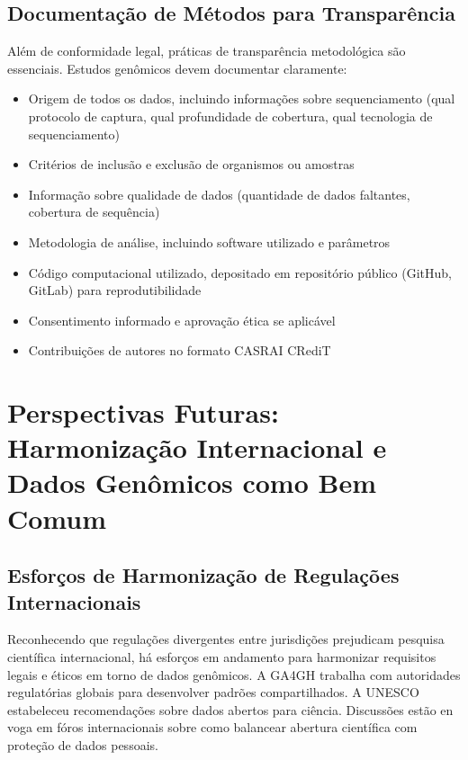 \subsection{Documentação de Métodos para Transparência}

Além de conformidade legal, práticas de transparência metodológica são essenciais. Estudos genômicos devem documentar claramente:

\begin{itemize}
    \item Origem de todos os dados, incluindo informações sobre sequenciamento (qual protocolo de captura, qual profundidade de cobertura, qual tecnologia de sequenciamento)
    \item Critérios de inclusão e exclusão de organismos ou amostras
    \item Informação sobre qualidade de dados (quantidade de dados faltantes, cobertura de sequência)
    \item Metodologia de análise, incluindo software utilizado e parâmetros
    \item Código computacional utilizado, depositado em repositório público (GitHub, GitLab) para reprodutibilidade
    \item Consentimento informado e aprovação ética se aplicável
    \item Contribuições de autores no formato CASRAI CRediT
\end{itemize}

\section{Perspectivas Futuras: Harmonização Internacional e Dados Genômicos como Bem Comum}

\subsection{Esforços de Harmonização de Regulações Internacionais}

Reconhecendo que regulações divergentes entre jurisdições prejudicam pesquisa científica internacional, há esforços em andamento para harmonizar requisitos legais e éticos em torno de dados genômicos. A GA4GH trabalha com autoridades regulatórias globais para desenvolver padrões compartilhados. A UNESCO estabeleceu recomendações sobre dados abertos para ciência. Discussões estão en voga em fóros internacionais sobre como balancear abertura científica com proteção de dados pessoais.

